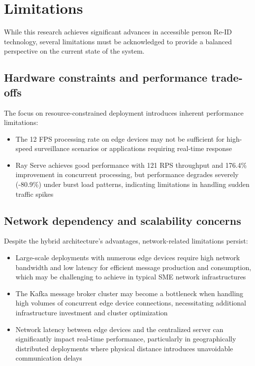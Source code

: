 \documentclass[../main.tex]{subfiles}
\begin{document}
\section{Limitations}

While this research achieves significant advances in accessible person Re-ID technology, several limitations must be acknowledged to provide a balanced perspective on the current state of the system.

\subsection{Hardware constraints and performance trade-offs}

The focus on resource-constrained deployment introduces inherent performance limitations:

\begin{itemize}
    \item The 12 FPS processing rate on edge devices may not be sufficient for high-speed surveillance scenarios or applications requiring real-time response
    \item Ray Serve achieves good performance with 121 RPS throughput and 176.4\% improvement in concurrent processing, but performance degrades severely (-80.9\%) under burst load patterns, indicating limitations in handling sudden traffic spikes
\end{itemize}

\subsection{Network dependency and scalability concerns}

Despite the hybrid architecture's advantages, network-related limitations persist:

\begin{itemize}
    \item Large-scale deployments with numerous edge devices require high network bandwidth and low latency for efficient message production and consumption, which may be challenging to achieve in typical SME network infrastructures
    \item The Kafka message broker cluster may become a bottleneck when handling high volumes of concurrent edge device connections, necessitating additional infrastructure investment and cluster optimization
    \item Network latency between edge devices and the centralized server can significantly impact real-time performance, particularly in geographically distributed deployments where physical distance introduces unavoidable communication delays
\end{itemize}
\end{document}
